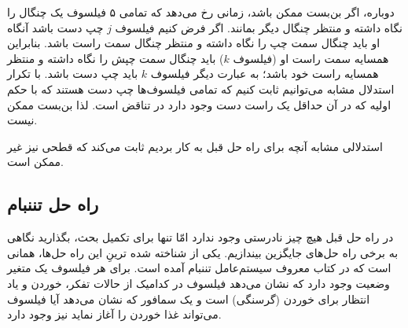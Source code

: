 \documentclass{book}
\newcommand{\clearemptydoublepage}{\newpage\cleardoublepage}
\begin{document}
    دوباره، اگر بن‌بست ممکن باشد، زمانی رخ می‌دهد که تمامی ۵ فیلسوف یک چنگال را نگاه داشته و منتظر چنگال دیگر بمانند. 
    اگر فرض کنیم فیلسوف $j$ چپ دست باشد آنگاه او باید چنگال سمت چپ را نگاه داشته و منتظر چنگال سمت راست باشد. 
    بنابراین همسایه سمت راست او (فیلسوف $k$) باید چنگال سمت چپش را نگاه داشته و منتظر همسایه راست خود باشد؛ به عبارت دیگر 
    فیلسوف $k$ باید چپ دست باشد. با تکرار استدلال مشابه می‌توانیم ثابت کنیم که تمامی فیلسوف‌ها چپ دست هستند که با حکم اولیه که در آن 
    حداقل یک راست دست وجود دارد در تناقض است. لذا بن‌بست ممکن نیست. 

    استدلالی مشابه آنچه برای راه حل قبل به کار بردیم ثابت می‌کند که قطحی نیز غیر ممکن است. 


\clearemptydoublepage
\subsection{راه حل تننبام}

    در راه حل قبل هیچ چیز نادرستی وجود ندارد امّا تنها برای تکمیل بحث، بگذارید نگاهی به برخی راه حل‌های جایگزین بیندازیم. 
    یکی از شناخته‌ شده ترینِ  این راه حل‌ها، همانی است که در کتاب معروف سیستم‌عامل تننبام آمده است\cite{tanenbaum}. 
    برای هر فیلسوف یک متغیر وضعیت وجود دارد که نشان می‌دهد فیلسوف در کدامیک از حالات تفکر، خوردن و یاد انتظار برای خوردن (گرسنگی) است و 
    یک سمافور که نشان می‌دهد آیا فیلسوف می‌تواند غذا خوردن را آغاز نماید نیز وجود دارد. 
\end{document}
